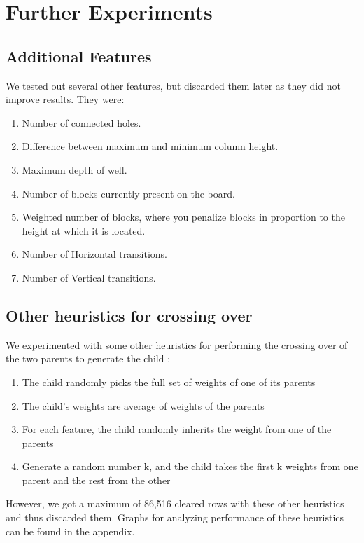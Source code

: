 \section{Further Experiments}
\subsection{Additional Features}
We tested out several other features, but discarded them later as they did not improve results. They were: 
\begin{enumerate}
\itemsep0em 
\item Number of connected holes.
\item Difference between maximum and minimum column height.
\item Maximum depth of well. 
\item Number of blocks currently present on the board.
\item Weighted number of blocks, where you penalize blocks in proportion to the height at which it is located.
\item Number of Horizontal transitions.
\item Number of Vertical transitions.
\end{enumerate}

\subsection{Other heuristics for crossing over}
We experimented with some other heuristics for performing the crossing over of the two parents to generate the child :
\begin{enumerate}
\itemsep0em 
\item The child randomly picks the full set of weights of one of its parents 
\item The child's weights are average of weights of the parents
\item For each feature, the child randomly inherits the weight from one of the parents
\item Generate a random number k, and the child takes the first k weights from one parent and the rest from the other
\end{enumerate}
However, we got a maximum of 86,516 cleared rows with these other heuristics and thus discarded them. Graphs for analyzing performance of these heuristics can be found in the appendix.


